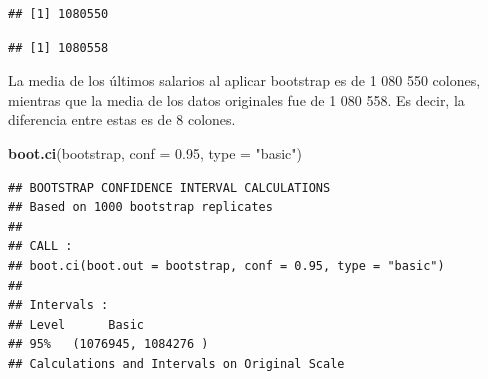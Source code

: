 \documentclass[
]{article}
\newenvironment{Shaded}{\begin{snugshade}}{\end{snugshade}}
\newcommand{\AttributeTok}[1]{\textcolor[rgb]{0.13,0.29,0.53}{#1}}
\newcommand{\CommentTok}[1]{\textcolor[rgb]{0.56,0.35,0.01}{\textit{#1}}}
\newcommand{\ControlFlowTok}[1]{\textcolor[rgb]{0.13,0.29,0.53}{\textbf{#1}}}
\newcommand{\DecValTok}[1]{\textcolor[rgb]{0.00,0.00,0.81}{#1}}
\newcommand{\FloatTok}[1]{\textcolor[rgb]{0.00,0.00,0.81}{#1}}
\newcommand{\FunctionTok}[1]{\textcolor[rgb]{0.13,0.29,0.53}{\textbf{#1}}}
\newcommand{\NormalTok}[1]{#1}
\newcommand{\OtherTok}[1]{\textcolor[rgb]{0.56,0.35,0.01}{#1}}
\newcommand{\SpecialCharTok}[1]{\textcolor[rgb]{0.81,0.36,0.00}{\textbf{#1}}}
\newcommand{\StringTok}[1]{\textcolor[rgb]{0.31,0.60,0.02}{#1}}
\begin{document}
\begin{Shaded}
\end{Shaded}

\begin{verbatim}
## [1] 1080550
\end{verbatim}

\begin{Shaded}
\end{Shaded}

\begin{verbatim}
## [1] 1080558
\end{verbatim}

La media de los últimos salarios al aplicar bootstrap es de 1 080 550
colones, mientras que la media de los datos originales fue de 1 080 558.
Es decir, la diferencia entre estas es de 8 colones.

\begin{Shaded}
\begin{Highlighting}[]
\FunctionTok{boot.ci}\NormalTok{(bootstrap, }\AttributeTok{conf =} \FloatTok{0.95}\NormalTok{, }\AttributeTok{type =} \StringTok{"basic"}\NormalTok{)}
\end{Highlighting}
\end{Shaded}

\begin{verbatim}
## BOOTSTRAP CONFIDENCE INTERVAL CALCULATIONS
## Based on 1000 bootstrap replicates
## 
## CALL : 
## boot.ci(boot.out = bootstrap, conf = 0.95, type = "basic")
## 
## Intervals : 
## Level      Basic         
## 95%   (1076945, 1084276 )  
## Calculations and Intervals on Original Scale
\end{verbatim}
\end{document}
